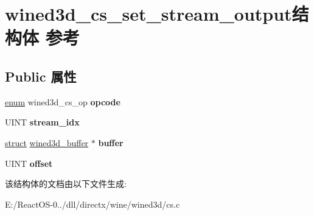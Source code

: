 \hypertarget{structwined3d__cs__set__stream__output}{}\section{wined3d\+\_\+cs\+\_\+set\+\_\+stream\+\_\+output结构体 参考}
\label{structwined3d__cs__set__stream__output}
\subsection*{Public 属性}
\begin{DoxyCompactItemize}
\item 
\mbox{\label{structwined3d__cs__set__stream__output_a8d07366b3ba4dd7b04722667e5ea522a}} 
\hyperlink{interfaceenum}{enum} wined3d\+\_\+cs\+\_\+op {\bfseries opcode}
\item 
\mbox{\label{structwined3d__cs__set__stream__output_a5a07a65eb10732e97c2753e024d4d3ff}} 
U\+I\+NT {\bfseries stream\+\_\+idx}
\item 
\mbox{\label{structwined3d__cs__set__stream__output_aacba07260d03c625d7b6e972b14e6445}} 
\hyperlink{interfacestruct}{struct} \hyperlink{structwined3d__buffer}{wined3d\+\_\+buffer} $\ast$ {\bfseries buffer}
\item 
\mbox{\label{structwined3d__cs__set__stream__output_ae8b67cfe67a15142336d0fdf79b3f658}} 
U\+I\+NT {\bfseries offset}
\end{DoxyCompactItemize}


该结构体的文档由以下文件生成\+:\begin{DoxyCompactItemize}
\item 
E\+:/\+React\+O\+S-\/0../dll/directx/wine/wined3d/cs.\+c\end{DoxyCompactItemize}
